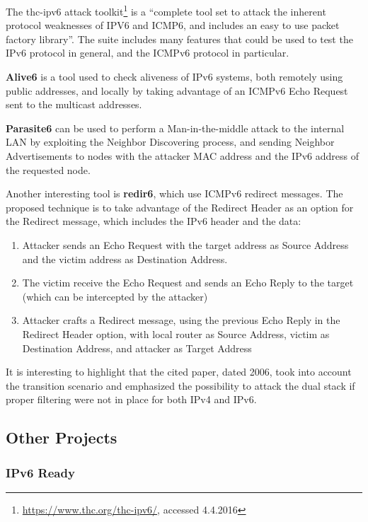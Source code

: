 \documentclass[12pt]{article}
\begin{document}
The thc-ipv6 attack toolkit\footnote{\url{https://www.thc.org/thc-ipv6/}, accessed 4.4.2016} is a ``complete tool set to attack the inherent protocol weaknesses of IPV6 and ICMP6, and includes an easy to use packet factory library''. The suite includes many features that could be used to test the IPv6 protocol in general, and the ICMPv6 protocol in particular\cite{thc}.

\textbf{Alive6} is a tool used to check aliveness of IPv6 systems, both remotely using public addresses, and locally by taking advantage of an ICMPv6 Echo Request sent to the multicast addresses.

\textbf{Parasite6} can be used to perform a Man-in-the-middle attack to the internal LAN by exploiting the Neighbor Discovering process, and sending Neighbor Advertisements to nodes with the attacker MAC address and the IPv6 address of the requested node.

Another interesting tool is \textbf{redir6}, which use ICMPv6 redirect messages. The proposed technique is to take advantage of the Redirect Header as an option for the Redirect message, which includes the IPv6 header and the data:
\vspace{-15pt}
\begin{enumerate}[noitemsep,topsep=0pt,partopsep=0pt]
 \item Attacker sends an Echo Request with the target address as Source Address and the victim address as Destination Address.
 \item The victim receive the Echo Request and sends an Echo Reply to the target (which can be intercepted by the attacker)
 \item Attacker crafts a Redirect message, using the previous Echo Reply in the Redirect Header option, with local router as Source Address, victim as Destination Address, and attacker as Target Address
\end{enumerate}
It is interesting to highlight that the cited paper, dated 2006, took into account the transition scenario and emphasized the possibility to attack the dual stack if proper filtering were not in place for both IPv4 and IPv6.


\subsection{Other Projects}
\label{sub:otherProj}

\subsubsection{IPv6 Ready}
\label{subsub:ipv6Ready}
\end{document}
